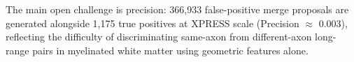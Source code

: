 The main open challenge is precision: 366{,}933 false-positive merge proposals
are generated alongside 1{,}175 true positives at XPRESS scale
(Precision $\approx$ 0.003), reflecting the difficulty of discriminating
same-axon from different-axon long-range pairs in myelinated white matter using
geometric features alone.
